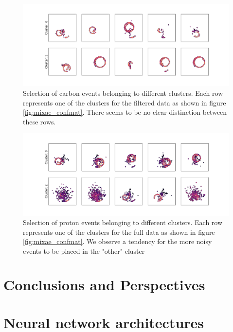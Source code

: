 \documentclass[preprint,12pt]{elsarticle}
\begin{document}
\begin{figure}
\centering
\includegraphics[width=\textwidth]{plots/clean_cluster_repr.pdf}
\caption[Selection of carbon events in differing clusters]{Selection of carbon events belonging to different clusters. Each row represents one of the clusters for the filtered data as shown in figure \ref{fig:mixae_confmat}. There seems to be no clear distinction between these rows.}\label{fig:filtered_mixae_clster_repr}	
\end{figure} 

\begin{figure}
\centering
\includegraphics[width=\textwidth]{plots/real_cluster_repr.pdf}	
\caption[Selection of proton events in differing clusters]{Selection of proton events belonging to different clusters. Each row represents one of the clusters for the full data as shown in figure \ref{fig:mixae_confmat}. We observe a tendency for the more noisy events to be placed in the "other" cluster}\label{fig:full_mixae_clster_repr}	
\end{figure} 

\section{Conclusions and Perspectives}\label{sec{conclusion}}

\appendix  
\section{Neural network architectures}
\end{document}
